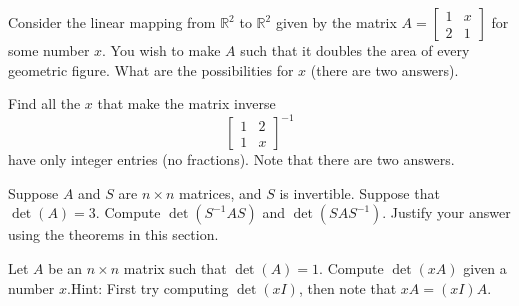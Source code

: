\begin{exercise}
Consider the linear mapping from ${\mathbb R}^2$ to ${\mathbb R}^2$
given by the  matrix
$A = \left[ \begin{smallmatrix}
1 & x \\
2 & 1
\end{smallmatrix} \right]$
for some number $x$.  You wish to make $A$ such that it doubles the area of
every geometric figure.  What are the possibilities for $x$ (there are two
answers).
\end{exercise}

\begin{exercise}[challenging]\ansMark%
Find all the $x$ that make the matrix inverse
\begin{equation*}
\begin{bmatrix}
1 & 2 \\ 1 & x
\end{bmatrix}^{-1}
\end{equation*}
have only integer entries (no fractions).
Note that there are two answers.
\end{exercise}

\begin{exercise}
Suppose $A$ and $S$ are $n \times n$ matrices, and $S$ is invertible.
Suppose that $\det(A) = 3$.  Compute $\det(S^{-1}AS)$ and 
$\det(SAS^{-1})$.  Justify your answer using the theorems in this section.
\end{exercise}

\begin{exercise}
Let $A$ be an $n \times n$ matrix such that $\det(A)=1$.
Compute $\det(x A)$ given a number $x$.\linebreak[2]
Hint: First try computing
$\det(xI)$, then note that $xA = (xI)A$.
\end{exercise}

\setcounter{exercise}{100}






